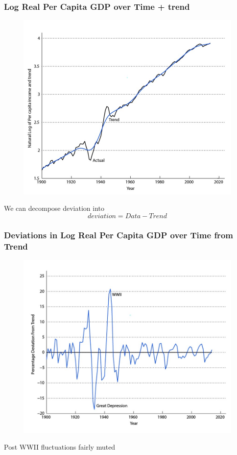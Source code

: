 \documentclass{beamer}
\begin{document}
\begin{frame}
\frametitle[alignment=center]{Log Real Per Capita GDP over Time + trend}
\begin{figure}
\includegraphics[scale=0.6]{Figures/W_Fig_1pt3.png}
\end{figure}
We can decompose deviation into $$deviation=Data-Trend$$
\end{frame}

\begin{frame}
\frametitle[alignment=center]{Deviations in Log Real Per Capita GDP over Time from Trend}
\begin{figure}
\includegraphics[scale=0.5]{Figures/W_Fig_1pt4.png}
\end{figure}
Post WWII fluctuations fairly muted
\end{frame}
\end{document}

